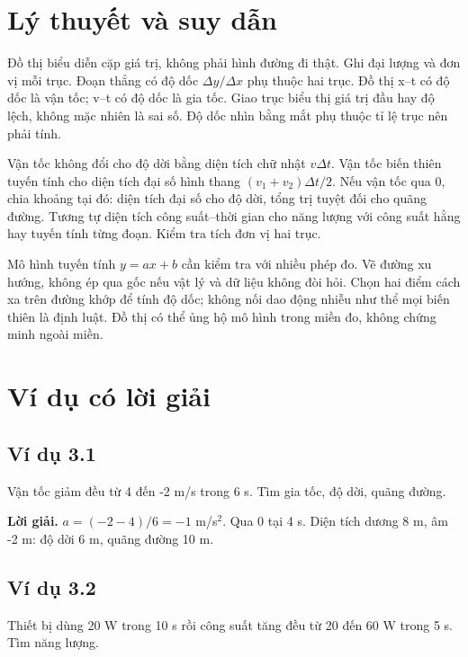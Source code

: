 \documentclass[11pt,a4paper,openany]{book}
\begin{document}
\section{Lý thuyết và suy dẫn}
Đồ thị biểu diễn cặp giá trị, không phải hình đường đi thật. Ghi đại lượng và đơn vị mỗi trục. Đoạn thẳng có độ dốc $\Delta y/\Delta x$ phụ thuộc hai trục. Đồ thị x–t có độ dốc là vận tốc; v–t có độ dốc là gia tốc. Giao trục biểu thị giá trị đầu hay độ lệch, không mặc nhiên là sai số. Độ dốc nhìn bằng mắt phụ thuộc tỉ lệ trục nên phải tính.

Vận tốc không đổi cho độ dời bằng diện tích chữ nhật $v\Delta t$. Vận tốc biến thiên tuyến tính cho diện tích đại số hình thang $(v_1+v_2)\Delta t/2$. Nếu vận tốc qua 0, chia khoảng tại đó: diện tích đại số cho độ dời, tổng trị tuyệt đối cho quãng đường. Tương tự diện tích công suất–thời gian cho năng lượng với công suất hằng hay tuyến tính từng đoạn. Kiểm tra tích đơn vị hai trục.

Mô hình tuyến tính $y=ax+b$ cần kiểm tra với nhiều phép đo. Vẽ đường xu hướng, không ép qua gốc nếu vật lý và dữ liệu không đòi hỏi. Chọn hai điểm cách xa trên đường khớp để tính độ dốc; không nối dao động nhiễu như thể mọi biến thiên là định luật. Đồ thị có thể ủng hộ mô hình trong miền đo, không chứng minh ngoài miền.
\begin{center}
\end{center}
\section{Ví dụ có lời giải}
\subsection*{Ví dụ 3.1}
Vận tốc giảm đều từ 4 đến -2 m/s trong 6 s. Tìm gia tốc, độ dời, quãng đường.

\textbf{Lời giải.} $a=(-2-4)/6=-1$ m/s$^2$. Qua 0 tại 4 s. Diện tích dương 8 m, âm -2 m: độ dời 6 m, quãng đường 10 m.
\subsection*{Ví dụ 3.2}
Thiết bị dùng 20 W trong 10 s rồi công suất tăng đều từ 20 đến 60 W trong 5 s. Tìm năng lượng.
\end{document}
